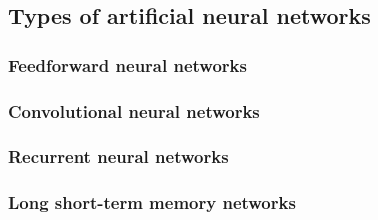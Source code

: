 \subsection{Types of artificial neural networks}

\subsubsection{Feedforward neural networks}
% 

\subsubsection{Convolutional neural networks}
% 

\subsubsection{Recurrent neural networks}

\subsubsection{Long short-term memory networks} %
